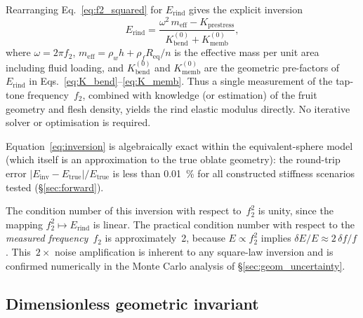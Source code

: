 Rearranging Eq.~\eqref{eq:f2_squared} for $E_{\mathrm{rind}}$ gives
the explicit inversion
\begin{equation}
  \boxed{
    E_{\mathrm{rind}} = \frac{\omega^2\, m_{\mathrm{eff}}
      - K_{\mathrm{prestress}}}
      {K_{\mathrm{bend}}^{(0)} + K_{\mathrm{memb}}^{(0)}},
  }
  \label{eq:inversion}
\end{equation}
where $\omega = 2\pi f_2$, $m_{\mathrm{eff}} = \rho_w h + \rho_f
R_{\mathrm{eq}} / n$ is the effective mass per unit area including
fluid loading, and $K_{\mathrm{bend}}^{(0)}$ and
$K_{\mathrm{memb}}^{(0)}$ are the geometric pre-factors of
$E_{\mathrm{rind}}$ in Eqs.~\eqref{eq:K_bend}--\eqref{eq:K_memb}.
Thus a single measurement of the tap-tone frequency~$f_2$, combined
with knowledge (or estimation) of the fruit geometry and flesh density,
yields the rind elastic modulus directly.  No iterative solver or
optimisation is required.

Equation~\eqref{eq:inversion} is algebraically exact within the
equivalent-sphere model (which itself is an approximation to the true
oblate geometry): the
round-trip error $|E_{\mathrm{inv}} - E_{\mathrm{true}}| /
E_{\mathrm{true}}$ is less than \SI{0.01}{\percent} for all constructed
stiffness scenarios tested (\S\ref{sec:forward}).

The condition number of this inversion with respect to~$f_2^2$ is unity,
since the mapping $f_2^2 \mapsto E_{\mathrm{rind}}$ is linear.  The
practical condition number with respect to the \emph{measured
frequency}~$f_2$ is approximately~2, because $E \propto f_2^2$ implies
$\delta E / E \approx 2\, \delta f / f$.  This~$2\times$ noise
amplification is inherent to any square-law inversion and is confirmed
numerically in the Monte Carlo analysis of \S\ref{sec:geom_uncertainty}.

\subsection{Dimensionless geometric invariant}
\label{sec:Pi_geom}

